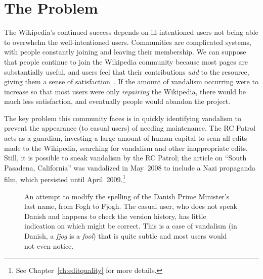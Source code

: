 \section{The Problem}

The Wikipedia's continued success depends on ill-intentioned users
not being able to overwhelm the well-intentioned users.
Communities are complicated systems, with people constantly joining and
leaving their membership.
We can suppose that people continue to
join the Wikipedia community because most pages are
substantially useful, and users feel that their contributions
\textit{add} to the resource,
giving them a sense of satisfaction~\cite{Benkler2002}.
If the amount of vandalism occurring were to increase so that
most users were only \textit{repairing} the Wikipedia, there
would be much less satisfaction, and eventually people would
abandon the project.

The key problem this community faces is in quickly identifying vandalism
to prevent the appearance (to casual users)
of needing maintenance.
The RC Patrol~\cite{wiki:RCPatrol} acts as a guardian,
investing a large amount of human capital to scan all
edits made to the Wikipedia, searching for vandalism and
other inappropriate edits.
Still, it is possible to sneak vandalism by the
RC Patrol; the article on ``South Pasadena, California''
was vandalized in May~2008 to include a Nazi propaganda film,
which persisted until April~2009.\footnote{See Chapter~\ref{ch:editquality}
for more details.}

\begin{figure}[t]
\centering
{}
\hspace{1ex}
\caption[An example of vandalism which is not obvious to the casual reader.]{An attempt to modify the
  spelling of the Danish Prime Minister's last name, from Fogh to Fjogh.
  The casual user, who does not speak Danish and happens to check
  the version history, has little indication on which might be correct.
  This is a case of vandalism
  (in Danish, a \textit{fjog} is a \textit{fool})
  that is quite subtle and most users would not even notice.}
\label{fig-denmark}
\end{figure}


